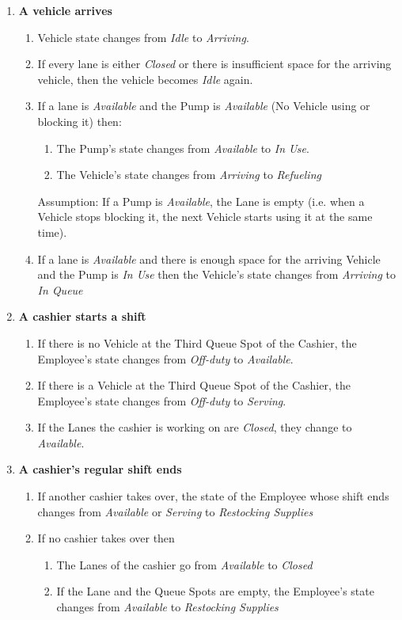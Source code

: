 \begin{enumerate}
	\item \textbf{A vehicle arrives}
	\begin{enumerate}
		\item Vehicle state changes from \textit{Idle} to \textit{Arriving}.
		\item If every lane is either \textit{Closed} or there is insufficient space for the arriving vehicle, then the vehicle becomes \textit{Idle} again.
		\item If a lane is \textit{Available} and the Pump is \textit{Available} (No Vehicle using or blocking it) then:
	\begin{enumerate}
		\item The Pump's state changes from \textit{Available} to \textit{In Use}.
		\item The Vehicle's state changes from \textit{Arriving} to \textit{Refueling}
	\end{enumerate}
	Assumption: If a Pump is \textit{Available}, the Lane is empty (i.e. when a Vehicle stops blocking it, the next Vehicle starts using it at the same time).
	\item If a lane is \textit{Available} and there is enough space for the arriving Vehicle and the Pump is \textit{In Use} then the Vehicle's state changes from \textit{Arriving} to \textit{In Queue}
	\end{enumerate}
	
	\item \textbf{A cashier starts a shift}
	\begin{enumerate}
		\item If there is no Vehicle at the Third Queue Spot of the Cashier, the Employee's state changes from \textit{Off-duty} to \textit{Available}.
		\item If there is a Vehicle at the Third Queue Spot of the Cashier, the Employee's state changes from \textit{Off-duty} to \textit{Serving}.
		\item If the Lanes the cashier is working on are \textit{Closed}, they change to \textit{Available}.
	\end{enumerate}
	
	\item \textbf{A cashier's regular shift ends}
	\begin{enumerate}
		\item If another cashier takes over, the state of the Employee whose shift ends changes from \textit{Available} or \textit{Serving} to \textit{Restocking Supplies}
		\item If no cashier takes over then
		\begin{enumerate}
			\item The Lanes of the cashier go from \textit{Available} to \textit{Closed}
			\item If the Lane and the Queue Spots are empty, the Employee's state changes from \textit{Available} to \textit{Restocking Supplies}
		\end{enumerate}
	\end{enumerate}
	

\end{enumerate}
